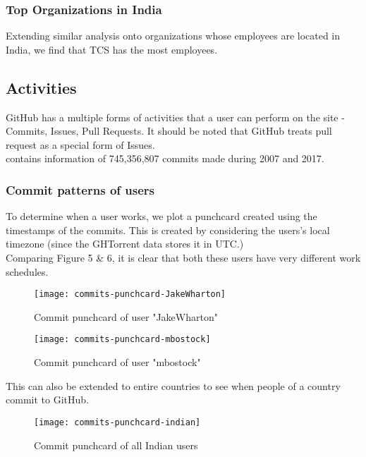 \subsubsection{Top Organizations in India}

Extending similar analysis onto organizations whose employees are located in India, we find that
TCS has the most employees.


\newpage
\subsection{Activities}

GitHub has a multiple forms of activities that a user can perform on the site - Commits, Issues, Pull Requests.
It should be noted that GitHub treats pull request as a special form of Issues. \\

 contains information of 745,356,807 commits made during 2007 and 2017.

\subsubsection{Commit patterns of users}

To determine when a user works, we plot a punchcard created using the timestamps of the commits.
This is created by considering the users's local timezone (since the GHTorrent data stores it in UTC.) \\

Comparing Figure 5 \& 6, it is clear that both these users have very different work schedules.

\begin{figure}[htb]
\centering
\texttt{[image: commits-punchcard-JakeWharton]}
\caption{Commit punchcard of user "JakeWharton"}
\end{figure}

\begin{figure}[htb]
\centering
\texttt{[image: commits-punchcard-mbostock]}
\caption{Commit punchcard of user "mbostock"}
\end{figure}

This can also be extended to entire countries to see when people of a country commit to GitHub.

\begin{figure}[htb]
\centering
\texttt{[image: commits-punchcard-indian]}
\caption{Commit punchcard of all Indian users}
\end{figure}

